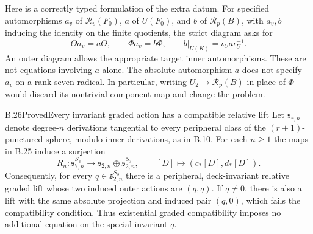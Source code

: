 Here is a correctly typed formulation of the extra datum. For specified
automorphisms $a_v$ of $\mathscr R_v(F_0)$, $a$ of $U(F_0)$, and $b$
of $\mathscr R_p(B)$, with $a_v,b$ inducing the identity on the finite
quotients, the strict diagram asks for
\[
 \Theta a_v=a\Theta,\qquad \Phi a_v=b\Phi,\qquad
 b|_{U(K)}=\iota_Ua\iota_U^{-1}.
\]
An outer diagram allows the appropriate target inner automorphisms.
These are not equations involving $a$ alone. The absolute automorphism
$a$ does not specify $a_v$ on a rank-seven radical. In particular,
writing $U_2\to\mathscr R_p(B)$ in place of $\Phi$ would discard its
nontrivial component map and change the problem.

\begin{statement}{B.26}{Proved}{Every invariant graded action has a compatible relative lift}
Let $\mathfrak s_{r,n}$ denote degree-$n$ derivations tangential to
every peripheral class of the $(r+1)$-punctured sphere, modulo inner
derivations, as in B.10. For each $n\ge1$ the maps in B.25 induce a
surjection
\[
 R_n:\mathfrak s_{7,n}^{S_3}
       \longrightarrow
       \mathfrak s_{2,n}\oplus\mathfrak s_{2,n}^{S_3},
 \qquad [D]\longmapsto(c_*[D],d_*[D]).
\]
Consequently, for every $q\in\mathfrak s_{2,n}^{S_3}$ there is a
peripheral, deck-invariant relative graded lift whose two induced
outer actions are $(q,q)$. If $q\ne0$, there is also a lift with the
same absolute projection and induced pair $(q,0)$, which fails the
compatibility condition. Thus existential graded compatibility
imposes no additional equation on the special invariant $q$.
\end{statement}
